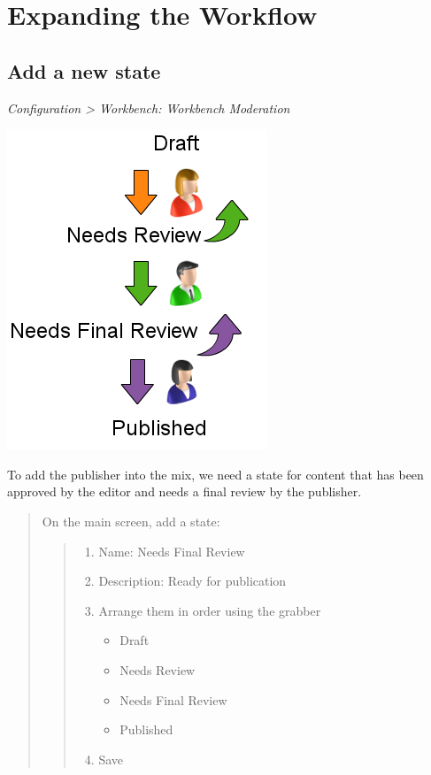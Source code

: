 \documentclass[letterpaper,10pt,english]{sphinxmanual}
\begin{document}
\chapter{Expanding the Workflow}
\label{moderation:expanding-the-workflow}

\section{Add a new state}
\label{moderation:add-a-new-state}
\emph{Configuration \textgreater{} Workbench: Workbench Moderation}

{\includegraphics{sites/default/files/recipes/moderation/workflow.png}\hfill}

To add the publisher into the mix, we need a state for content that has been approved by the editor and needs a final review by the publisher.
\begin{quote}

On the main screen, add a state:
\begin{quote}
\begin{enumerate}
\item {} 
Name: Needs Final Review

\item {} 
Description: Ready for publication

\item {} 
Arrange them in order using the grabber
\begin{itemize}
\item {} 
Draft

\item {} 
Needs Review

\item {} 
Needs Final Review

\item {} 
Published

\end{itemize}

\end{enumerate}
\begin{enumerate}
\setcounter{enumi}{3}
\item {} 
Save

\end{enumerate}
\end{quote}
\end{quote}
\end{document}
